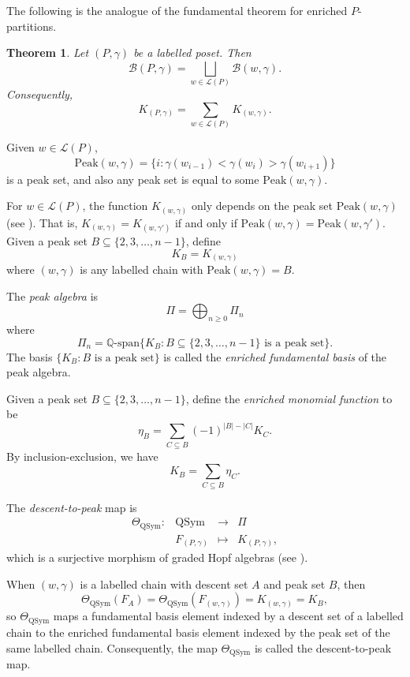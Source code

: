 \documentclass[11pt]{amsart}
\newtheorem{Theorem}{Theorem}[section]
\numberwithin{equation}{section}
\newcommand{\QSym}{\mathrm{QSym}}
\newcommand{\Peak}{\mathrm{Peak}}
\newcommand{\peak}{\mathrm{Peak}}
\newcommand{\bbQ}{{\mathbb{Q}}}
\begin{document}
The following is the analogue of the fundamental theorem for enriched $P$-partitions.

\begin{Theorem}\label{thm:eppar}\cite[Lemma 2.1]{S97}  
	Let $(P,\gamma)$ be a labelled poset. Then 
	$$\mathcal{B}(P,\gamma)=\bigsqcup_{w\in\mathcal{L}(P)}\mathcal{B}(w,\gamma).$$ Consequently,
	$$K_{(P,\gamma)}=\sum_{w\in\mathcal{L}(P)}K_{(w,\gamma)}.$$
\end{Theorem}


Given $w\in \mathcal{L}(P)$, $$\peak(w,\gamma)=\{i:\gamma(w_{i-1})<\gamma(w_i)>\gamma(w_{i+1})\}$$ is a peak set, and also any peak set is equal to some $\peak(w,\gamma)$.

For $w\in\mathcal{L}(P)$, the function $K_{(w,\gamma)}$ only depends on the peak set $\peak(w,\gamma)$ (see  \cite[Section 2.2]{S97}). That is, $K_{(w,\gamma)}=K_{(w,\gamma')}$ if and only if $\peak(w,\gamma)=\peak(w,\gamma')$. Given a peak set $B\subseteq\{2,3,\dots,n-1\}$, define $$K_B=K_{(w,\gamma)}$$ where $(w,\gamma)$ is any labelled chain with $\Peak(w,\gamma)=B$. 

The \emph{peak algebra} is 
$$\Pi=\displaystyle\bigoplus_{n\geq 0}\Pi_n$$
where
$$\Pi_n=\bbQ\text{-span}\{K_B:B\subseteq\{2,3,\dots,n-1\} \text{~is a peak set}\}.$$
The basis $\{K_B: B \text{~is a peak set}\}$ is called the {\it enriched fundamental basis} of the peak algebra. 

Given a peak set $B\subseteq \{2,3,\dots,n-1\}$, define the \emph{enriched monomial function} to be 
\[\eta_B=\sum_{C\subseteq B} (-1)^{|B|-|C|} K_{C}.\] 
 By inclusion-exclusion, we have 
 \[K_B=\sum_{C\subseteq B} \eta_C.\]

The \emph{descent-to-peak} map is 
$$\begin{array}{cccc}
	\Theta_\QSym: & \QSym & \to & \Pi\\
	& F_{(P,\gamma)} & \mapsto & K_{(P,\gamma)},
\end{array}$$
which is a surjective morphism of graded Hopf algebras (see \cite{BMSvW}).

When $(w,\gamma)$ is a labelled chain with descent set $A$ and peak set $B$, then 
$$\Theta_{\QSym}(F_{A})=\Theta_{\QSym}(F_{(w,\gamma)})=K_{(w,\gamma)}=K_B,$$ so  $\Theta_{\QSym}$ maps a fundamental basis element indexed by a descent set of a labelled chain to the enriched fundamental basis element indexed by the peak set of the same labelled chain. Consequently, the map $\Theta_{\QSym}$ is called the descent-to-peak map. 
\end{document}
